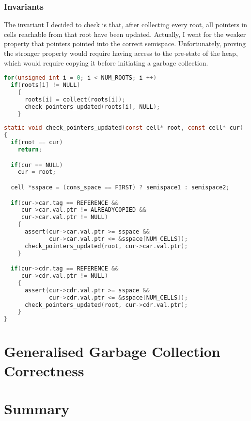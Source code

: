 \subsubsection{Invariants}
\label{sec:results-impl-c-invariants}

The invariant I decided to check is that, after collecting every root,
all pointers in cells reachable from that root have been
updated. Actually, I went for the weaker property that pointers
pointed into the correct semispace. Unfortunately, proving the
stronger property would require having access to the pre-state of the
heap, which would require copying it before initiating a garbage
collection.

\begin{lstlisting}[language=C,caption={Fenichel/Yochelson GC Loop}]
for(unsigned int i = 0; i < NUM_ROOTS; i ++)
  if(roots[i] != NULL)
    {
      roots[i] = collect(roots[i]);
      check_pointers_updated(roots[i], NULL);
    }
\end{lstlisting}

\begin{lstlisting}[language=C,caption={Fenichel/Yochelson Pointer Checking}]
static void check_pointers_updated(const cell* root, const cell* cur)
{
  if(root == cur)
    return;

  if(cur == NULL)
    cur = root;

  cell *sspace = (cons_space == FIRST) ? semispace1 : semispace2;

  if(cur->car.tag == REFERENCE &&
     cur->car.val.ptr != ALREADYCOPIED &&
     cur->car.val.ptr != NULL)
    {
      assert(cur->car.val.ptr >= sspace &&
             cur->car.val.ptr <= &sspace[NUM_CELLS]);
      check_pointers_updated(root, cur->car.val.ptr);
    }

  if(cur->cdr.tag == REFERENCE &&
     cur->cdr.val.ptr != NULL)
    {
      assert(cur->cdr.val.ptr >= sspace &&
             cur->cdr.val.ptr <= &sspace[NUM_CELLS]);
      check_pointers_updated(root, cur->cdr.val.ptr);
    }
}
\end{lstlisting}

\section{Generalised Garbage Collection Correctness}
\label{sec:results-correctness}


\section{Summary}
\label{sec:results-summary}

